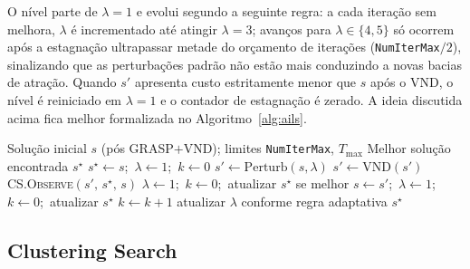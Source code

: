 \documentclass[a4paper,11pt]{article}
\begin{document}
O nível parte de $\lambda = 1$ e evolui segundo a seguinte regra: a cada iteração sem melhora, $\lambda$ é incrementado até atingir $\lambda = 3$; avanços para $\lambda \in \{4, 5\}$ só ocorrem após a estagnação ultrapassar metade do orçamento de iterações (\texttt{NumIterMax}$/2$), sinalizando que as perturbações padrão não estão mais conduzindo a novas bacias de atração. Quando $s'$ apresenta custo estritamente menor que $s$ após o VND, o nível é reiniciado em $\lambda = 1$ e o contador de estagnação é zerado. A ideia discutida acima fica melhor formalizada no Algoritmo~\ref{alg:ails}. 


\begin{algorithm}[htbp]
\caption{Adaptive Iterated Local Search (AILS)}
\label{alg:ails}
\begin{algorithmic}[1]
\Require Solução inicial $s$ (pós GRASP$+$VND); limites \texttt{NumIterMax}, $T_{\max}$
\Ensure Melhor solução encontrada $s^{\star}$
\State $s^{\star} \gets s$;\ $\lambda \gets 1$;\ $k \gets 0$
    \State $s' \gets \mathrm{Perturb}(s, \lambda)$
    \State $s' \gets \mathrm{VND}(s')$ 
    \State CS.\textsc{Observe}$(s',\, s^{\star},\, s)$ 
        \State $\lambda \gets 1$;\ $k \gets 0$;\ atualizar $s^{\star}$ se melhor
        \State $s \gets s'$;\ $\lambda \gets 1$;\ $k \gets 0$;\ atualizar $s^{\star}$
    \Else
        \State $k \gets k + 1$
        \State atualizar $\lambda$ conforme regra adaptativa
    \EndIf
\EndWhile
\State \Return $s^{\star}$
\end{algorithmic}
\end{algorithm}

\subsection{Clustering Search}
\label{subsec:cs}
\end{document}
